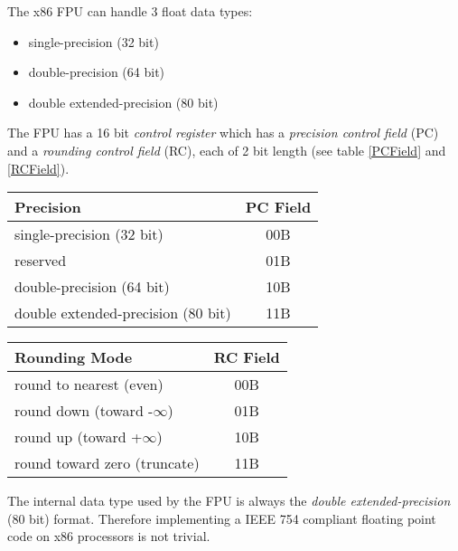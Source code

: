 The x86 FPU can handle 3 float data types:

\begin{itemize}
 \item single-precision (32 bit)
 \item double-precision (64 bit)
 \item double extended-precision (80 bit)
\end{itemize}

The FPU has a 16 bit \textit{control register} which has a
\textit{precision control field} (PC) and a \textit{rounding control
field} (RC), each of 2 bit length (see table \ref{PCField} and
\ref{RCField}).

\begin{table*}
\begin{center}
\begin{tabular}[b]{|l|c|}
\hline 
Precision                          & PC Field \\ \hline
single-precision (32 bit)          & 00B      \\ \hline
reserved                           & 01B      \\ \hline
double-precision (64 bit)          & 10B      \\ \hline
double extended-precision (80 bit) & 11B      \\ \hline
\end{tabular}
\caption{Precision Control Field (PC)}
\label{PCField}
\end{center}
\end{table*}

\begin{table*}
\begin{center}
\begin{tabular}[b]{|l|c|}
\hline 
Rounding Mode                 & RC Field \\ \hline
round to nearest (even)       & 00B      \\ \hline
round down (toward -$\infty$) & 01B      \\ \hline
round up (toward +$\infty$)   & 10B      \\ \hline
round toward zero (truncate)  & 11B      \\ \hline
\end{tabular}
\caption{Rounding Control Field (RC)}
\label{RCField}
\end{center}
\end{table*}

The internal data type used by the FPU is always the \textit{double
extended-precision} (80 bit) format. Therefore implementing a IEEE 754
compliant floating point code on x86 processors is not trivial.

